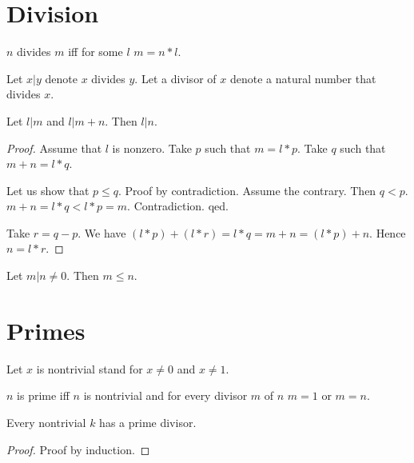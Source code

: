 \documentclass[11pt]{article}
\begin{document}
\section{Division}

\begin{forthel}

\begin{definition}
  $n$ divides $m$ iff for some $l$ $m = n * l$.
\end{definition}

Let $x | y$ denote $x$ divides $y$.
Let a divisor of $x$ denote a natural number 
that divides $x$.

\begin{lemma} Let $l | m$ and $l | m + n$. Then $l | n$.
\end{lemma}

\begin{proof}
Assume that $l$ is nonzero.
Take $p$ such that $m = l * p$. 
Take $q$ such that $m + n = l * q$.

Let us show that 
$p \leq q$.
Proof by contradiction.
Assume the contrary. Then $q < p$.
$m+n = l * q < l * p = m$.
Contradiction. qed.

Take $r = q - p$.
We have $(l * p) + (l * r) = l * q = m + n = (l * p) + n$.
Hence $n = l * r$.
\end{proof}

\begin{lemma} Let $m | n \neq 0$. Then $m \leq n$.
\end{lemma}

\end{forthel}

\section{Primes}

\begin{forthel}

Let $x$ is nontrivial stand for $x \neq 0$ and $x \neq 1$.

\begin{definition}
$n$ is prime iff $n$ is nontrivial and
    for every divisor $m$ of $n$ $m = 1$ or $m = n$.
\end{definition}

\begin{lemma} Every nontrivial $k$ has a prime divisor.
\end{lemma}
\begin{proof} Proof by induction.
\end{proof}

\end{forthel}
\end{document}
